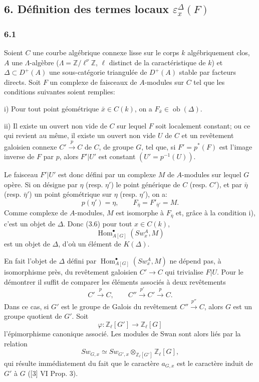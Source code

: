 \documentclass[11pt]{article}
\DeclareMathOperator{\Hom}{Hom}
\providecommand{\Ob}{\operatorname{ob}}
\providecommand{\Hom}{\operatorname{Hom}}
\providecommand{\Ob}{\operatorname{ob}}
\providecommand{\Ob}{\operatorname{Ob}}
\providecommand{\Hom}{\operatorname{Hom}}
\providecommand{\Ob}{\operatorname{ob}}
\providecommand{\Ob}{\operatorname{Ob}}
\begin{document}
\subsection*{6. Définition des termes locaux $\varepsilon_x^\Delta(F)$}

\subsubsection*{6.1}

Soient $C$ une courbe algébrique connexe lisse sur le corps $k$ algébriquement clos, $A$ une $\Lambda$-algèbre ($\Lambda=\mathbb Z/\ell^\nu\mathbb Z$, $\ell$ distinct de la caractéristique de $k$) et $\Delta\subset D^+(A)$ une sous-catégorie triangulée de $D^+(A)$ stable par facteurs directs. Soit $F$ un complexe de faisceaux de $A$-modules sur $C$ tel que les conditions suivantes soient remplies:

i) Pour tout point géométrique $\bar x\in C(k)$, on a $F_{\bar x}\in\Ob(\Delta)$.

ii) Il existe un ouvert non vide de $C$ sur lequel $F$ soit localement constant; ou ce qui revient au même, il existe un ouvert non vide $U$ de $C$ et un revêtement galoisien connexe $C'\xrightarrow{p}C$ de $C$, de groupe $G$, tel que, si $F'=p^*(F)$ est l'image inverse de $F$ par $p$, alors $F'|U'$ est constant $(U'=p^{-1}(U))$.

Le faisceau $F'|U'$ est donc défini par un complexe $M$ de $A$-modules sur lequel $G$ opère. Si on désigne par $\eta$ (resp. $\eta'$) le point générique de $C$ (resp. $C'$), et par $\bar\eta$ (resp. $\bar\eta'$) un point géométrique sur $\eta$ (resp. $\eta'$), on a:
\[
p(\eta')=\eta,\qquad
F_{\bar\eta}=F'_{\bar\eta'}=M.
\tag{6.1.1}
\]
Comme complexe de $A$-modules, $M$ est isomorphe à $F_{\bar\eta}$ et, grâce à la condition i), c'est un objet de $\Delta$. Donc (3.6) pour tout $x\in C(k)$,
\[
\Hom^\bullet_{A[G]}(Sw_x^A,M)
\]
est un objet de $\Delta$, d'où un élément de $K(\Delta)$.

En fait l'objet de $\Delta$ défini par $\Hom^\bullet_{A[G]}(Sw_x^A,M)$ ne dépend pas, à isomorphisme près, du revêtement galoisien $C'\to C$ qui trivialise $F|U$. Pour le démontrer il suffit de comparer les éléments associés à deux revêtements
\[
C'\xrightarrow{p}C,\qquad C''\xrightarrow{p'}C'\xrightarrow{p}C.
\]
Dans ce cas, si $G'$ est le groupe de Galois du revêtement $C''\xrightarrow{p''}C$, alors $G$ est un groupe quotient de $G'$. Soit
\[
\varphi:\mathbb Z_\ell[G']\longrightarrow \mathbb Z_\ell[G]
\]
l'épimorphisme canonique associé. Les modules de Swan sont alors liés par la relation
\[
Sw_{G,x}\simeq Sw_{G',x}\otimes_{\mathbb Z_\ell[G']}\mathbb Z_\ell[G],
\]
qui résulte immédiatement du fait que le caractère $a_{G,x}$ est le caractère induit de $G'$ à $G$ ([3] VI Prop. 3).
\end{document}

